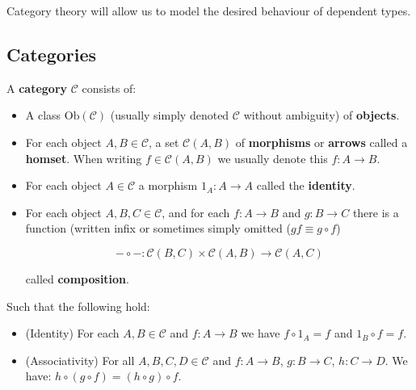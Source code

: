 Category theory will allow us to model the desired behaviour of dependent types. 

\subsection{Categories}

\begin{defin}
	A {\bf category} $\mathcal{C}$ consists of:
	\begin{itemize}
		\item A class $\text{Ob}(\mathcal{C})$ (usually simply denoted $\mathcal{C}$ without ambiguity) of {\bf objects}.
		\item For each object $A,B \in \mathcal{C}$, a set $\mathcal{C}(A,B)$ of \textbf{morphisms} or \textbf{arrows} called a \textbf{homset}. When writing $f \in \mathcal{C}(A,B)$ we usually denote this $f : A \to B$.
		\item For each object $A \in \mathcal{C}$ a morphism $1_A : A \to A$ called the {\bf identity}.
		\item For each object $A,B,C \in \mathcal{C}$, and for each $f : A \to B$ and $g : B \to C$ there is a function (written infix or sometimes simply omitted ($gf \equiv g \circ f$)
		
		$$
			- \circ - : \mathcal{C}(B,C) \times \mathcal{C}(A,B) \to \mathcal{C}(A,C)
		$$
		
		called {\bf composition}.
	\end{itemize}
	
	Such that the following hold:
	
	\begin{itemize}
		\item (Identity) For each $A,B \in \mathcal{C}$ and $f : A \to B$ we have $f \circ 1_A = f$ and $1_B \circ f = f$.
		\item (Associativity) For all $A,B,C,D \in \mathcal{C}$ and $f : A \to B$, $g : B \to C$, $h : C \to D$. We have: $h \circ (g \circ f) = (h \circ g) \circ f$.
	\end{itemize}
\end{defin}

